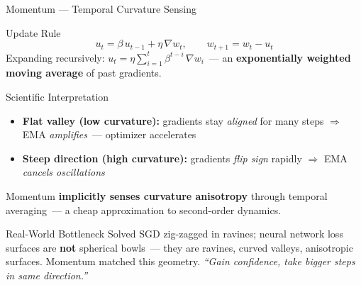 \documentclass{beamer}
\begin{document}
\begin{frame}[shrink=10]{Momentum --- Temporal Curvature Sensing}
  \begin{block}{Update Rule}
    \[
      u_t = \beta\,u_{t-1} + \eta\,\nabla w_t,
      \qquad
      w_{t+1} = w_t - u_t
    \]
    Expanding recursively:
    $u_t = \eta\displaystyle\sum_{i=1}^{t}\beta^{t-i}\,\nabla w_i$~---
    an \textbf{exponentially weighted moving average} of past gradients.
  \end{block}

  \medskip

  \begin{block}{Scientific Interpretation}
    \begin{itemize}\setlength\itemsep{5pt}
      \item \textbf{Flat valley (low curvature):} gradients stay
            \emph{aligned} for many steps
            $\Rightarrow$ EMA \emph{amplifies}~---
            optimizer accelerates
      \item \textbf{Steep direction (high curvature):} gradients
            \emph{flip sign} rapidly
            $\Rightarrow$ EMA \emph{cancels oscillations}
    \end{itemize}
    Momentum \textbf{implicitly senses curvature anisotropy}
    through temporal averaging~---
    a cheap approximation to second-order dynamics.
  \end{block}

  \begin{alertblock}{Real-World Bottleneck Solved}
    SGD zig-zagged in ravines;
    neural network loss surfaces are \textbf{not} spherical bowls~---
    they are ravines, curved valleys, anisotropic surfaces.
    Momentum matched this geometry.
    \textit{``Gain confidence, take bigger steps in same direction.''}
  \end{alertblock}
\end{frame}
\end{document}
